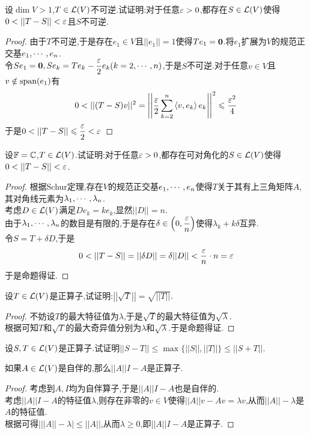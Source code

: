 \documentclass{ctexart}
\begin{document}
\begin{problem}[10.]
    设$\dim V>1$,$T\in\mathcal{L}(V)$不可逆.试证明:对于任意$\varepsilon>0$,都存在$S\in\mathcal{L}(V)$使得$0<||T-S||<\ep$且$S$不可逆.
\end{problem}
\begin{proof}
    由于$T$不可逆,于是存在$e_1\in V$且$||e_1||=1$使得$Te_1=\mathbf0$.将$e_1$扩展为$V$的规范正交基${e}_1,\cdots,{e}_{n}$.\\
    令$Se_1=\mathbf0,Se_k=Te_k-\dfrac{\varepsilon}{2}e_k(k=2,\cdots,n)$,于是$S$不可逆.对于任意$v\in V$且$v\notin\text{span}(e_1)$有
    \[0<||(T-S)v||^2=\left|\left|\dfrac{\ep}{2}\sum_{k=2}^{n}\inprod{v}{e_k}e_k\right|\right|^2\leqslant\dfrac{\ep^2}{4}\]
    于是$0<||T-S||\leqslant\dfrac\ep2<\ep$
\end{proof}
\begin{problem}[11.]
    设$\mathbb{F}=\mathbb{C}$,$T\in\mathcal{L}(V)$.试证明:对于任意$\varepsilon>0$,都存在可对角化的$S\in\mathcal{L}(V)$使得$0<||T-S||<\ep$.
\end{problem}
\begin{proof}
    根据Schur定理,存在$V$的规范正交基${e}_1,\cdots,{e}_{n}$使得$T$关于其有上三角矩阵$A$,其对角线元素为${\lambda}_1,\cdots,{\lambda}_{n}$.\\
    考虑$D\in\mathcal{L}(V)$满足$De_k=ke_k$,显然$||D||=n$.\\
    由于${\lambda}_1,\cdots,{\lambda}_{n}$的数目是有限的,于是存在$\delta\in\left(0,\dfrac{\varepsilon}{n}\right)$使得$\lambda_k+k\delta$互异.\\
    令$S=T+\delta D$,于是
    \[0<||T-S||=||\delta D||=\delta||D||<\dfrac{\ep}{n}\cdot n=\ep\]
    于是命题得证.
\end{proof}
\begin{problem}[12.]
    设$T\in\mathcal{L}(V)$是正算子,试证明:$\left|\left|\sqrt{T}\right|\right|=\sqrt{\left|\left|T\right|\right|}$.
\end{problem}
\begin{proof}
    不妨设$T$的最大特征值为$\lambda$,于是$\sqrt{T}$的最大特征值为$\sqrt{\lambda}$.\\
    根据可知$T$和$\sqrt{T}$的最大奇异值分别为$\lambda$和$\sqrt{\lambda}$.于是命题得证.
\end{proof}
\begin{problem}[13.]
    设$S,T\in\mathcal{L}(V)$是正算子.试证明$||S-T||\leqslant\max\{||S||,||T||\}\leqslant||S+T||$.
\end{problem}
\begin{lemma}[Lemma.L.13]
    如果$A\in\mathcal{L}(V)$是自伴的,那么$||A||I-A$是正算子.
\end{lemma}
\begin{proof}
    考虑到$A,I$均为自伴算子,于是$||A||I-A$也是自伴的.\\
    考虑$||A||I-A$的特征值$\lambda$,则存在非零的$v\in V$使得$||A||v-Av=\lambda v$,从而$||A||-\lambda$是$A$的特征值.\\
    根据可得$\left|||A||-\lambda\right|\leqslant||A||$,从而$\lambda\geqslant0$,即$||A||I-A$是正算子.
\end{proof}
\end{document}
